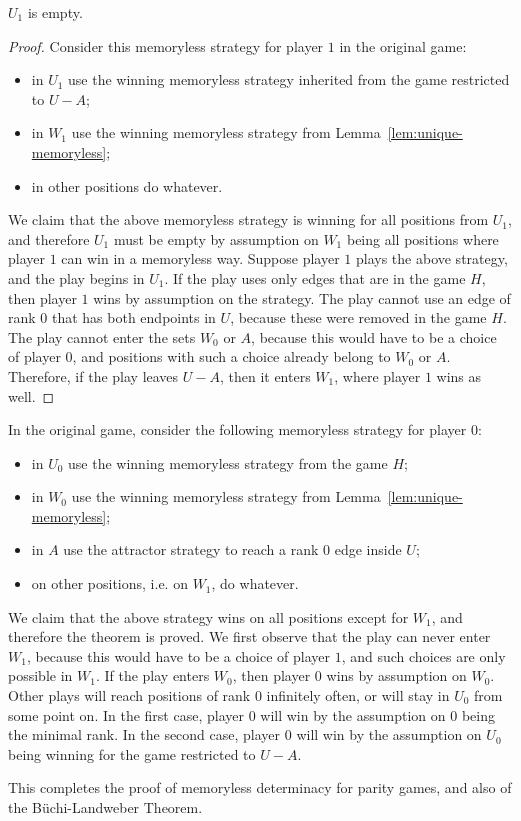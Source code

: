 \begin{lemma}
$U_1$ is empty.	
\end{lemma}
\begin{proof}
	Consider this memoryless strategy for player $1$ in the original game:
	\begin{itemize}
		\item in $U_1$ use the winning memoryless strategy inherited from the game restricted to $U-A$;
		\item in $W_1$ use the winning memoryless strategy from Lemma~\ref{lem:unique-memoryless};
\item  in other positions do whatever. 
	\end{itemize}
We claim that the above memoryless strategy is winning for all positions from $U_1$, and therefore $U_1$ must be empty by assumption on $W_1$ being all positions where player $1$ can win in a memoryless way. Suppose player $1$ plays the above strategy, and the play begins in $U_1$. If the play uses only edges that are in the game $H$, then  player $1$ wins by assumption on the strategy. The play cannot use an edge of rank $0$ that has both endpoints in $U$, because these were removed in the game $H$. The play cannot enter  the sets  $W_0$ or $A$, because this would have to be a choice of player $0$, and  positions with such a choice already belong to $W_0$ or $A$. Therefore, if the play leaves $U-A$, then it enters $W_1$, where player $1$ wins as well. 
\end{proof}




In the original game, consider the following memoryless strategy for player $0$:
\begin{itemize}
	\item in $U_0$ use the winning memoryless strategy  from the game $H$;
	\item in $W_0$ use the winning memoryless strategy from Lemma~\ref{lem:unique-memoryless};
	\item in $A$ use the attractor strategy to reach a rank $0$ edge inside $U$;
	\item on other positions, i.e. on $W_1$, do whatever.
\end{itemize}

We claim that the above strategy wins on all positions except for $W_1$, and therefore the theorem is proved. We first observe that the play can never enter $W_1$, because this would have to be a choice of player $1$, and such choices are only possible in $W_1$.  If the play enters $W_0$, then player $0$ wins by assumption on $W_0$. Other plays will reach positions of rank $0$ infinitely often,  or will stay in $U_0$ from some point on. In the first case, player $0$ will win by the assumption on $0$ being the minimal rank. In the second case, player $0$ will win by the assumption on $U_0$ being winning for the game restricted to $U-A$. 

This completes the proof of memoryless determinacy for parity games, and also of the Büchi-Landweber Theorem.


